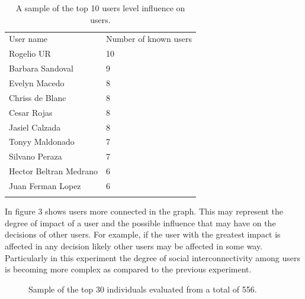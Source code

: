 \begin{table}
\small
\caption{A sample of the top 10 users level influence on users.}
\label{tab:knownUsers_2} 
\centering
\small
\begin{tabular}{p{3cm} p{3cm}  }
\hline\noalign{\smallskip}
 User name & Number of known users \\
\noalign{\smallskip}\hline\noalign{\smallskip}
\small{Rogelio UR} & \small{10}  \\ \hline 
\small{Barbara Sandoval} & \small{9}  \\ \hline
\small{Evelyn Macedo} & \small{8}  \\ \hline
\small{Chriss de Blanc} & \small{8}  \\ \hline
\small{Cesar Rojas} & \small{8}  \\ \hline
\small{Jasiel Calzada} & \small{8}  \\ \hline
\small{Tonyy Maldonado} & \small{7}  \\ \hline
\small{Silvano Peraza} & \small{7}  \\ \hline 
\small{Hector Beltran Medrano} & \small{6}  \\ \hline 
\small{Juan Ferman Lopez} & \small{6}  \\ \hline 
\noalign{\smallskip}\hline
\end{tabular}
\end{table}

In figure 3 shows users more connected in the graph. This may represent the
degree of impact of a user and the possible influence that may have on the
decisions of other users.  For example, if the user with the greatest impact is
affected in any decision likely other users may be affected in some way.
Particularly in this experiment the degree of social interconnectivity among
users is becoming more complex as compared to the previous experiment.

\begin{figure}
\centering
{} %
\caption{Sample of the top 30 individuals evaluated from a total of 556.}
\label{fig:bestIndividuals_2}   
\end{figure}

